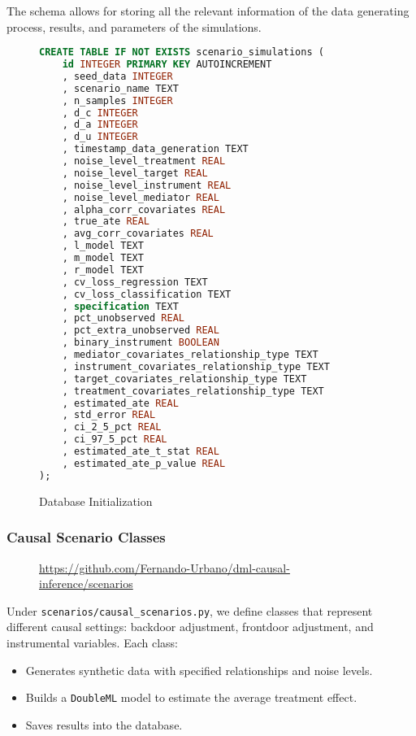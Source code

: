 \documentclass{article}
\numberwithin{equation}{section}
\begin{document}
The schema allows for storing all the relevant information of the data generating process, results, and parameters of the simulations.

\begin{figure}[H]
    \begin{lstlisting}[language=sql]
CREATE TABLE IF NOT EXISTS scenario_simulations (
    id INTEGER PRIMARY KEY AUTOINCREMENT
    , seed_data INTEGER
    , scenario_name TEXT
    , n_samples INTEGER
    , d_c INTEGER
    , d_a INTEGER
    , d_u INTEGER
    , timestamp_data_generation TEXT      
    , noise_level_treatment REAL
    , noise_level_target REAL
    , noise_level_instrument REAL
    , noise_level_mediator REAL  
    , alpha_corr_covariates REAL
    , true_ate REAL
    , avg_corr_covariates REAL
    , l_model TEXT
    , m_model TEXT
    , r_model TEXT
    , cv_loss_regression TEXT
    , cv_loss_classification TEXT
    , specification TEXT
    , pct_unobserved REAL
    , pct_extra_unobserved REAL
    , binary_instrument BOOLEAN            
    , mediator_covariates_relationship_type TEXT  
    , instrument_covariates_relationship_type TEXT  
    , target_covariates_relationship_type TEXT       
    , treatment_covariates_relationship_type TEXT    
    , estimated_ate REAL
    , std_error REAL
    , ci_2_5_pct REAL
    , ci_97_5_pct REAL
    , estimated_ate_t_stat REAL
    , estimated_ate_p_value REAL
);
\end{lstlisting}
\caption{Database Initialization}
\end{figure}

\subsubsection{Causal Scenario Classes}

\begin{figure}[H]
    \centering
    \url{https://github.com/Fernando-Urbano/dml-causal-inference/scenarios}
\end{figure}

Under \texttt{scenarios/causal\_scenarios.py}, we define classes that represent different causal settings: backdoor adjustment, frontdoor adjustment, and instrumental variables. Each class:

\begin{itemize}
    \item Generates synthetic data with specified relationships and noise levels.
    \item Builds a \texttt{DoubleML} model to estimate the average treatment effect.
    \item Saves results into the database.
\end{itemize}
\end{document}
